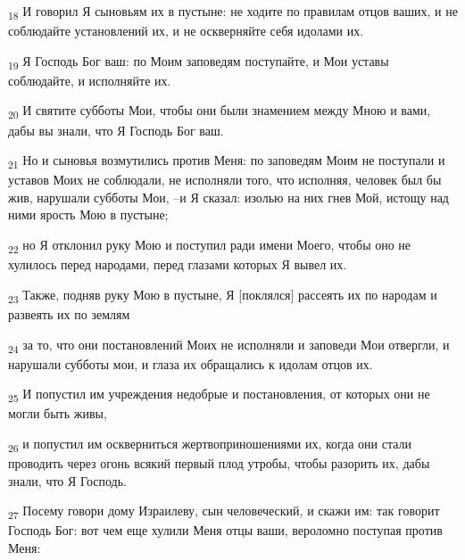 \begin{tcolorbox}
\textsubscript{18} И говорил Я сыновьям их в пустыне: не ходите по правилам отцов ваших, и не соблюдайте установлений их, и не оскверняйте себя идолами их.
\end{tcolorbox}
\begin{tcolorbox}
\textsubscript{19} Я Господь Бог ваш: по Моим заповедям поступайте, и Мои уставы соблюдайте, и исполняйте их.
\end{tcolorbox}
\begin{tcolorbox}
\textsubscript{20} И святите субботы Мои, чтобы они были знамением между Мною и вами, дабы вы знали, что Я Господь Бог ваш.
\end{tcolorbox}
\begin{tcolorbox}
\textsubscript{21} Но и сыновья возмутились против Меня: по заповедям Моим не поступали и уставов Моих не соблюдали, не исполняли того, что исполняя, человек был бы жив, нарушали субботы Мои, --и Я сказал: изолью на них гнев Мой, истощу над ними ярость Мою в пустыне;
\end{tcolorbox}
\begin{tcolorbox}
\textsubscript{22} но Я отклонил руку Мою и поступил ради имени Моего, чтобы оно не хулилось перед народами, перед глазами которых Я вывел их.
\end{tcolorbox}
\begin{tcolorbox}
\textsubscript{23} Также, подняв руку Мою в пустыне, Я [поклялся] рассеять их по народам и развеять их по землям
\end{tcolorbox}
\begin{tcolorbox}
\textsubscript{24} за то, что они постановлений Моих не исполняли и заповеди Мои отвергли, и нарушали субботы мои, и глаза их обращались к идолам отцов их.
\end{tcolorbox}
\begin{tcolorbox}
\textsubscript{25} И попустил им учреждения недобрые и постановления, от которых они не могли быть живы,
\end{tcolorbox}
\begin{tcolorbox}
\textsubscript{26} и попустил им оскверниться жертвоприношениями их, когда они стали проводить через огонь всякий первый плод утробы, чтобы разорить их, дабы знали, что Я Господь.
\end{tcolorbox}
\begin{tcolorbox}
\textsubscript{27} Посему говори дому Израилеву, сын человеческий, и скажи им: так говорит Господь Бог: вот чем еще хулили Меня отцы ваши, вероломно поступая против Меня:
\end{tcolorbox}
